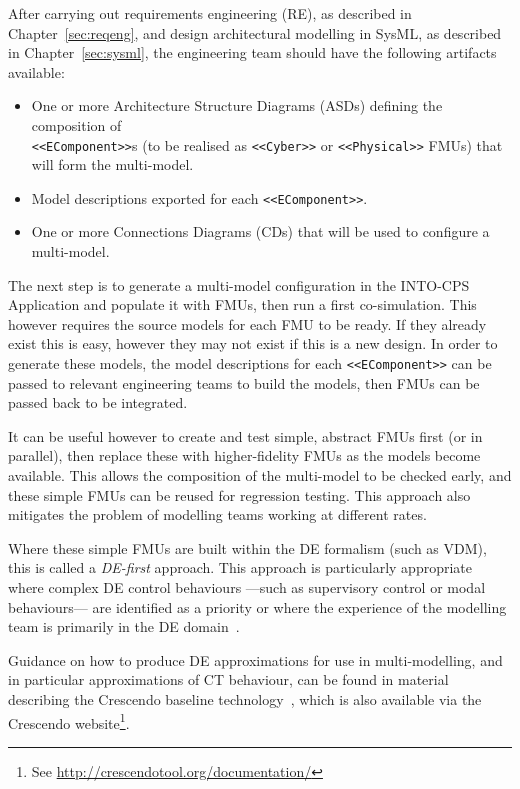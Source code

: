 After carrying out requirements engineering (RE), as described in Chapter~\ref{sec:reqeng}, and design architectural modelling in SysML, as described in Chapter~\ref{sec:sysml}, the engineering team should have the following artifacts available:

\begin{itemize}[noitemsep]
\item One or more Architecture Structure Diagrams (ASDs) defining the composition of\\ \texttt{<<EComponent>>}s (to be realised as \texttt{<<Cyber>>} or \texttt{<<Physical>>} FMUs) that will form the multi-model.
\item Model descriptions exported for each \texttt{<<EComponent>>}.
\item One or more Connections Diagrams (CDs) that will be used to configure a multi-model.
\end{itemize}

The next step is to generate a multi-model configuration in the INTO-CPS Application and populate it with FMUs, then run a first co-simulation. This however requires the source models for each FMU to be ready. If they already exist this is easy, however they may not exist if this is a new design. In order to generate these models, the model descriptions for each \texttt{<<EComponent>>} can be passed to relevant engineering teams to build the models, then FMUs can be passed back to be integrated.

It can be useful however to create and test simple, abstract FMUs first (or in parallel), then replace these with higher-fidelity FMUs as the models become available. This allows the composition of the multi-model to be checked early, and these simple FMUs can be reused for regression testing. This approach also mitigates the problem of modelling teams working at different rates.

Where these simple FMUs are built within the DE formalism (such as VDM), this is called a \emph{DE-first} approach. This approach is particularly appropriate where complex DE control behaviours ---such as supervisory control or modal behaviours--- are identified as a priority or where the experience of the modelling team is primarily in the DE domain~\cite{Fitzgerald&14c}.

Guidance on how to produce DE approximations for use in multi-modelling, and in particular approximations of CT behaviour, can be found in material describing the Crescendo baseline technology~\cite{Fitzgerald&13a}, which is also available via the Crescendo website\footnote{See \url{http://crescendotool.org/documentation/}}.

